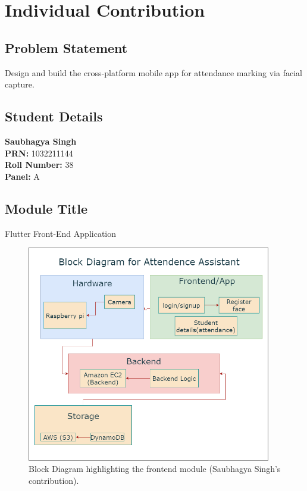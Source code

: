 \documentclass[openany]{report}
\begin{document}
\chapter{Individual Contribution}
\section{Problem Statement}
Design and build the cross-platform mobile app for attendance marking via facial capture.

\section{Student Details}
\textbf{Saubhagya Singh} \\
\textbf{PRN:} 1032211144 \\
\textbf{Roll Number:} 38 \\
\textbf{Panel:} A \\

\section{Module Title}
Flutter Front-End Application

\begin{figure}[H]
    \centering
    \includegraphics[width=0.95\textwidth]{../imgs/block diagram.png}
    \caption{Block Diagram highlighting the frontend module (Saubhagya Singh’s contribution).}
    \label{fig:block_diagram_saubhagya}
\end{figure}
\end{document}
